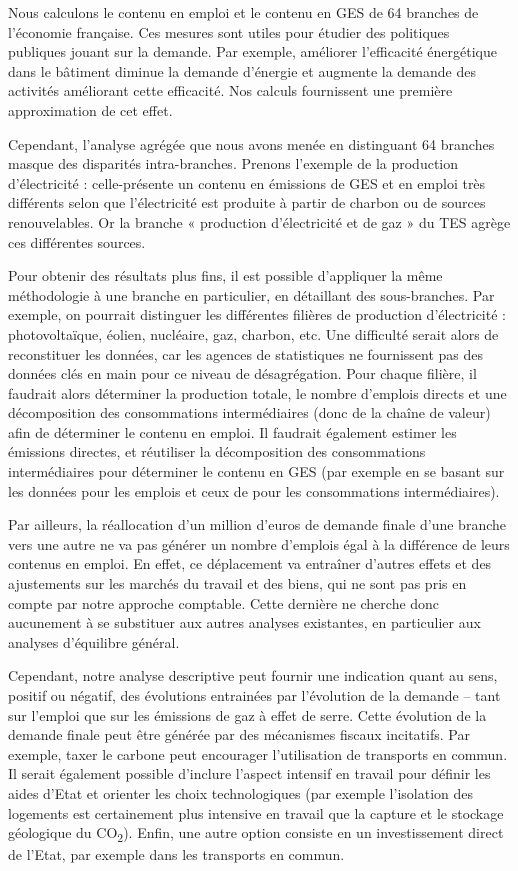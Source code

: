Nous calculons le contenu en emploi et le contenu en GES de 64 branches de l’économie française. 
Ces mesures sont utiles pour étudier des politiques publiques jouant sur la demande. 
Par exemple, améliorer l’efficacité énergétique dans le bâtiment diminue la demande d’énergie et augmente la demande des activités améliorant cette efficacité. Nos calculs fournissent une première approximation de cet effet.

Cependant, l’analyse agrégée que nous avons menée en distinguant 64 branches masque des disparités intra-branches. Prenons l’exemple de la production d’électricité : celle-présente un contenu en émissions de GES et en emploi très différents selon que l’électricité est produite à partir de charbon ou de sources renouvelables. 
Or la branche « production d’électricité et de gaz » du TES agrège ces différentes sources.

Pour obtenir des résultats plus fins, il est possible d’appliquer la même méthodologie à une branche en particulier, en détaillant des sous-branches. 
Par exemple, on pourrait distinguer les différentes filières de production d’électricité : photovoltaïque, éolien, nucléaire, gaz, charbon, etc. 
Une difficulté serait alors de reconstituer les données, car les agences de statistiques ne fournissent pas des données clés en main pour ce niveau de désagrégation. 
Pour chaque filière, il faudrait alors déterminer la production totale, le nombre d’emplois directs et une décomposition des consommations intermédiaires (donc de la chaîne de valeur) afin de déterminer le contenu en emploi. 
Il faudrait également estimer les émissions directes, et réutiliser la décomposition des consommations intermédiaires pour déterminer le contenu en GES (par exemple en se basant sur les données \citet{InNumeri2016} pour les emplois et ceux de \citet{Lehr2008} pour les consommations intermédiaires).

Par ailleurs, la réallocation d’un million d’euros de demande finale d’une branche vers une autre ne va pas générer un nombre d’emplois égal à la différence de leurs contenus en emploi. 
En effet, ce déplacement va entraîner d’autres effets et des ajustements sur les marchés du travail et des biens, qui ne sont pas pris en compte par notre approche comptable. 
Cette dernière ne cherche donc aucunement à se substituer aux autres analyses existantes, en particulier aux analyses d’équilibre général.

Cependant, notre analyse descriptive peut fournir une indication quant au sens, positif ou négatif, des évolutions entrainées par l’évolution de la demande – tant sur l’emploi que sur les émissions de gaz à effet de serre. 
Cette évolution de la demande finale peut être générée par des mécanismes fiscaux incitatifs. 
Par exemple, taxer le carbone peut encourager l’utilisation de transports en commun. 
Il serait également possible d’inclure l’aspect intensif en travail pour définir les aides d’Etat et orienter les choix technologiques (par exemple l'isolation des logements est certainement plus intensive en travail que la capture et le stockage géologique du CO\textsubscript{2}). 
Enfin, une autre option consiste en un investissement direct de l’Etat, par exemple dans les transports en commun.

